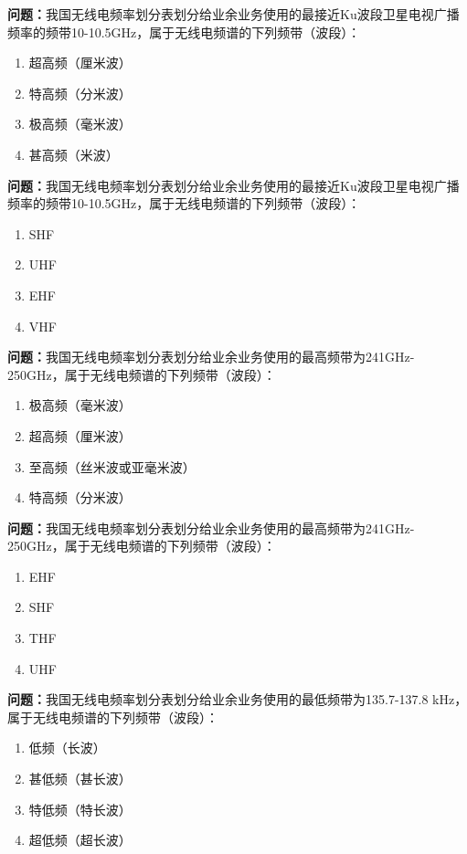 \bigskip


\noindent\textbf{问题：}我国无线电频率划分表划分给业余业务使用的最接近Ku波段卫星电视广播频率的频带10-10.5GHz，属于无线电频谱的下列频带（波段）：
\begin{enumerate}[label=\Alph*), leftmargin=3em]
\item 超高频（厘米波）
\item 特高频（分米波）
\item 极高频（毫米波）
\item 甚高频（米波）
\end{enumerate}

\bigskip


\noindent\textbf{问题：}我国无线电频率划分表划分给业余业务使用的最接近Ku波段卫星电视广播频率的频带10-10.5GHz，属于无线电频谱的下列频带（波段）：
\begin{enumerate}[label=\Alph*), leftmargin=3em]
\item SHF
\item UHF
\item EHF
\item VHF
\end{enumerate}

\bigskip


\noindent\textbf{问题：}我国无线电频率划分表划分给业余业务使用的最高频带为241GHz-250GHz，属于无线电频谱的下列频带（波段）：
\begin{enumerate}[label=\Alph*), leftmargin=3em]
\item 极高频（毫米波）
\item 超高频（厘米波）
\item 至高频（丝米波或亚毫米波）
\item 特高频（分米波）
\end{enumerate}

\bigskip


\noindent\textbf{问题：}我国无线电频率划分表划分给业余业务使用的最高频带为241GHz-250GHz，属于无线电频谱的下列频带（波段）：
\begin{enumerate}[label=\Alph*), leftmargin=3em]
\item EHF
\item SHF
\item THF
\item UHF
\end{enumerate}

\bigskip


\noindent\textbf{问题：}我国无线电频率划分表划分给业余业务使用的最低频带为135.7-137.8 kHz，属于无线电频谱的下列频带（波段）：
\begin{enumerate}[label=\Alph*), leftmargin=3em]
\item 低频（长波）
\item 甚低频（甚长波）
\item 特低频（特长波）
\item 超低频（超长波）
\end{enumerate}

